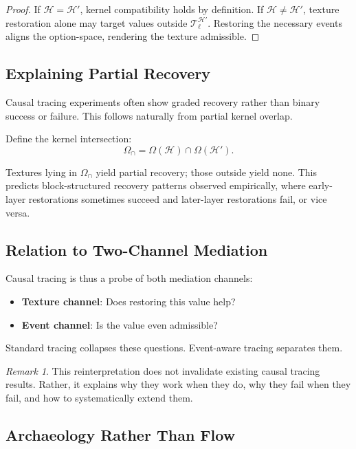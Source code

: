 \documentclass[11pt]{article}
\theoremstyle{remark}
\newtheorem{remark}{Remark}
\newcommand{\Hist}{\mathcal{H}}
\begin{document}
\begin{proof}
If $\Hist = \Hist'$, kernel compatibility holds by definition.
If $\Hist \neq \Hist'$, texture restoration alone may target values
outside $\mathcal{T}_\ell^{\Hist'}$. Restoring the necessary events
aligns the option-space, rendering the texture admissible.
\end{proof}

\subsection{Explaining Partial Recovery}

Causal tracing experiments often show graded recovery rather than binary
success or failure. This follows naturally from partial kernel overlap.

Define the kernel intersection:
\[
\Omega_\cap = \Omega(\Hist) \cap \Omega(\Hist').
\]

Textures lying in $\Omega_\cap$ yield partial recovery; those outside
yield none. This predicts block-structured recovery patterns observed
empirically, where early-layer restorations sometimes succeed and
later-layer restorations fail, or vice versa.

\subsection{Relation to Two-Channel Mediation}

Causal tracing is thus a probe of both mediation channels:
\begin{itemize}
\item \textbf{Texture channel}: Does restoring this value help?
\item \textbf{Event channel}: Is the value even admissible?
\end{itemize}

Standard tracing collapses these questions. Event-aware tracing
separates them.

\begin{remark}
This reinterpretation does not invalidate existing causal tracing
results. Rather, it explains why they work when they do, why they fail
when they fail, and how to systematically extend them.
\end{remark}

\subsection{Archaeology Rather Than Flow}
\end{document}
